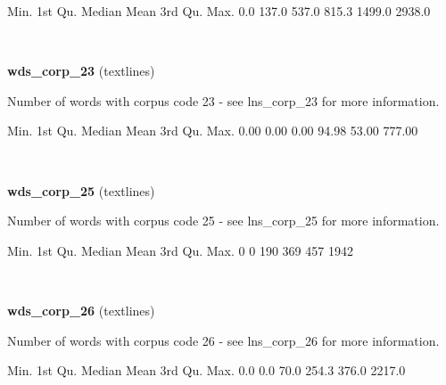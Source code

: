 \documentclass[]{article}
\newenvironment{Shaded}{\begin{snugshade}}{\end{snugshade}}
\newcommand{\DecValTok}[1]{\textcolor[rgb]{0.00,0.00,0.81}{{#1}}}
\newcommand{\FloatTok}[1]{\textcolor[rgb]{0.00,0.00,0.81}{{#1}}}
\newcommand{\NormalTok}[1]{{#1}}
\begin{document}
\begin{Shaded}
\begin{Highlighting}[]
   \NormalTok{Min. 1st Qu.  Median    Mean 3rd Qu.    Max. }
    \FloatTok{0.0}   \FloatTok{137.0}   \FloatTok{537.0}   \FloatTok{815.3}  \FloatTok{1499.0}  \FloatTok{2938.0} 
\end{Highlighting}
\end{Shaded}

~

\vspace{1em}

\textbf{wds\_corp\_23} (textlines)

Number of words with corpus code 23 - see lns\_corp\_23 for more
information.

\begin{Shaded}
\begin{Highlighting}[]
   \NormalTok{Min. 1st Qu.  Median    Mean 3rd Qu.    Max. }
   \FloatTok{0.00}    \FloatTok{0.00}    \FloatTok{0.00}   \FloatTok{94.98}   \FloatTok{53.00}  \FloatTok{777.00} 
\end{Highlighting}
\end{Shaded}

~

\vspace{1em}

\textbf{wds\_corp\_25} (textlines)

Number of words with corpus code 25 - see lns\_corp\_25 for more
information.

\begin{Shaded}
\begin{Highlighting}[]
   \NormalTok{Min. 1st Qu.  Median    Mean 3rd Qu.    Max. }
      \DecValTok{0}       \DecValTok{0}     \DecValTok{190}     \DecValTok{369}     \DecValTok{457}    \DecValTok{1942} 
\end{Highlighting}
\end{Shaded}

~

\vspace{1em}

\textbf{wds\_corp\_26} (textlines)

Number of words with corpus code 26 - see lns\_corp\_26 for more
information.

\begin{Shaded}
\begin{Highlighting}[]
   \NormalTok{Min. 1st Qu.  Median    Mean 3rd Qu.    Max. }
    \FloatTok{0.0}     \FloatTok{0.0}    \FloatTok{70.0}   \FloatTok{254.3}   \FloatTok{376.0}  \FloatTok{2217.0} 
\end{Highlighting}
\end{Shaded}
\end{document}
